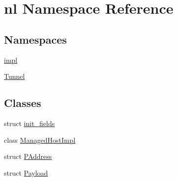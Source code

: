 \hypertarget{namespacenl}{}\section{nl Namespace Reference}
\label{namespacenl}
\subsection*{Namespaces}
\begin{DoxyCompactItemize}
\item 
 \hyperlink{namespacenl_1_1impl}{impl}
\item 
 \hyperlink{namespacenl_1_1Tunnel}{Tunnel}
\end{DoxyCompactItemize}
\subsection*{Classes}
\begin{DoxyCompactItemize}
\item 
struct \hyperlink{structnl_1_1init__fields}{init\+\_\+fields}
\item 
class \hyperlink{classnl_1_1ManagedHostImpl}{Managed\+Host\+Impl}
\item 
struct \hyperlink{structnl_1_1PAddress}{P\+Address}
\item 
struct \hyperlink{structnl_1_1Payload}{Payload}
\end{DoxyCompactItemize}
